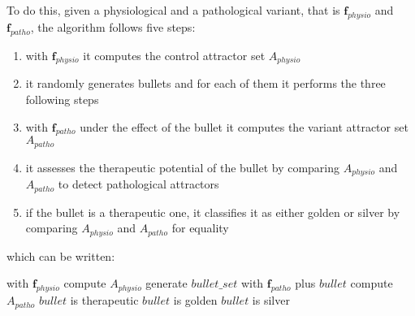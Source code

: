 \documentclass[oneside,a4paper,onecolumn,notitlepage,final]{article}
\begin{document}
To do this, given a physiological and a pathological variant, that is $\boldsymbol{f}_{physio}$ and $\boldsymbol{f}_{patho}$, the algorithm follows five steps:
\begin{enumerate}
\item with $\boldsymbol{f}_{physio}$ it computes the control attractor set $A_{physio}$
\item it randomly generates bullets and for each of them it performs the three following steps
\item with $\boldsymbol{f}_{patho}$ under the effect of the bullet it computes the variant attractor set $A_{patho}$
\item it assesses the therapeutic potential of the bullet by comparing $A_{physio}$ and $A_{patho}$ to detect pathological attractors
\item if the bullet is a therapeutic one, it classifies it as either golden or silver by comparing $A_{physio}$ and $A_{patho}$ for equality
\end{enumerate}
which can be written:
\begin{algorithmic}[1]
\STATE with $\boldsymbol{f}_{physio}$ compute $A_{physio}$
\STATE generate $bullet\_set$
    \STATE with $\boldsymbol{f}_{patho}$ plus $bullet$ compute $A_{patho}$
        \STATE $bullet$ is therapeutic
            \STATE $bullet$ is golden
        \ELSE
            \STATE $bullet$ is silver
        \ENDIF
    \ENDIF
\ENDFOR
\end{algorithmic}
\end{document}
